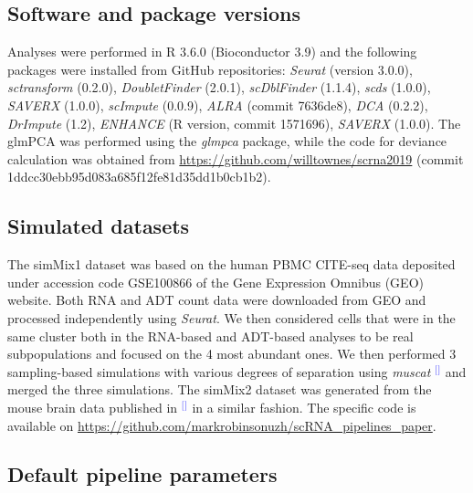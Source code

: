 \documentclass[11pt]{article}
\renewcommand{\cite}[1]{\textcolor{Blue}{$^[$\supercite{#1}$^]$}}
\begin{document}
\subsection*{Software and package versions}
Analyses were performed in R 3.6.0 (Bioconductor 3.9) and the following packages were installed from GitHub repositories: \textit{Seurat} (version 3.0.0), \textit{sctransform} (0.2.0), \textit{DoubletFinder} (2.0.1), \textit{scDblFinder} (1.1.4), \textit{scds} (1.0.0), \textit{SAVERX} (1.0.0), \textit{scImpute} (0.0.9), \textit{ALRA} (commit 7636de8), \textit{DCA} (0.2.2), \textit{DrImpute} (1.2), \textit{ENHANCE} (R version, commit 1571696), \textit{SAVERX} (1.0.0). {\color{red}The glmPCA was performed using the \textit{glmpca} package, while the code for deviance calculation was obtained from \url{https://github.com/willtownes/scrna2019} (commit 1ddcc30ebb95d083a685f12fe81d35dd1b0cb1b2).}

\subsection*{Simulated datasets}
The simMix1 dataset was based on the human PBMC CITE-seq data deposited under accession code GSE100866 of the Gene Expression Omnibus (GEO) website. Both RNA and ADT count data were downloaded from GEO and processed independently using \textit{Seurat}. We then considered cells that were in the same cluster both in the RNA-based and ADT-based analyses to be real subpopulations and focused on the 4 most abundant ones. We then performed 3 sampling-based simulations with various degrees of separation using \textit{muscat} \cite{CrowellMuscat2019} and merged the three simulations. The simMix2 dataset was generated from the mouse brain data published in \cite{CrowellMuscat2019} in a similar fashion. The specific code is available on \url{https://github.com/markrobinsonuzh/scRNA\_pipelines\_paper}.

\subsection*{Default pipeline parameters}
\end{document}
